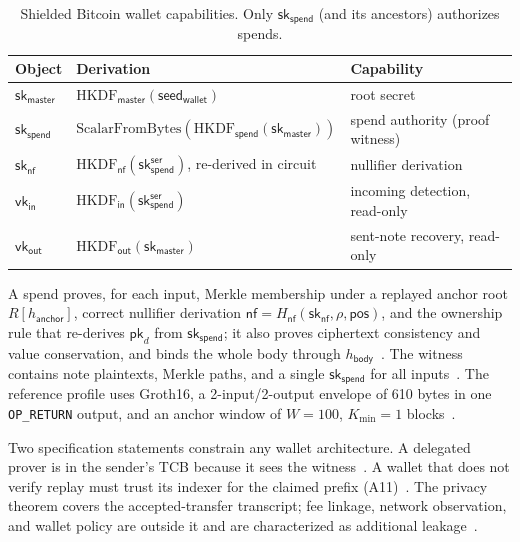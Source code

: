 \documentclass[11pt]{article}
\theoremstyle{remark}
\newcommand{\sk}{\mathsf{sk}}
\newcommand{\vk}{\mathsf{vk}}
\newcommand{\seed}{\mathsf{seed}_{\mathsf{wallet}}}
\newcommand{\SB}{Shielded Bitcoin}
\begin{document}
\begin{table}[t]
\centering\small
\begin{tabularx}{\linewidth}{@{}lXl@{}}
\toprule
Object & Derivation~\cite{sb26} & Capability \\
\midrule
$\sk_{\mathsf{master}}$ & $\mathrm{HKDF}_{\mathsf{master}}(\seed)$ & root secret \\
$\sk_{\mathsf{spend}}$ & $\mathrm{ScalarFromBytes}(\mathrm{HKDF}_{\mathsf{spend}}(\sk_{\mathsf{master}}))$ & spend authority (proof witness) \\
$\sk_{\mathsf{nf}}$ & $\mathrm{HKDF}_{\mathsf{nf}}(\sk^{\mathsf{ser}}_{\mathsf{spend}})$, re-derived in circuit & nullifier derivation \\
$\vk_{\mathsf{in}}$ & $\mathrm{HKDF}_{\mathsf{in}}(\sk^{\mathsf{ser}}_{\mathsf{spend}})$ & incoming detection, read-only \\
$\vk_{\mathsf{out}}$ & $\mathrm{HKDF}_{\mathsf{out}}(\sk_{\mathsf{master}})$ & sent-note recovery, read-only \\
\bottomrule
\end{tabularx}
\caption{\SB{} wallet capabilities. Only $\sk_{\mathsf{spend}}$ (and its ancestors) authorizes spends.}
\label{tab:caps}
\end{table}

A spend proves, for each input, Merkle membership under a replayed anchor root $R[h_{\mathsf{anchor}}]$, correct nullifier derivation $\mathsf{nf} = H_{\mathsf{nf}}(\sk_{\mathsf{nf}}, \rho, \mathsf{pos})$, and the ownership rule that re-derives $\mathsf{pk}_d$ from $\sk_{\mathsf{spend}}$; it also proves ciphertext consistency and value conservation, and binds the whole body through $h_{\mathsf{body}}$~\cite[§13--14]{sb26}. The witness contains note plaintexts, Merkle paths, and a single $\sk_{\mathsf{spend}}$ for all inputs~\cite[§14.3]{sb26}. The reference profile uses Groth16, a 2-input/2-output envelope of 610 bytes in one \texttt{OP\_RETURN} output, and an anchor window of $W{=}100$, $K_{\min}{=}1$ blocks~\cite[App.~A]{sb26}.

Two specification statements constrain any wallet architecture. A delegated prover is in the sender's TCB because it sees the witness~\cite[§10]{sb26}. A wallet that does not verify replay must trust its indexer for the claimed prefix (A11)~\cite[§17]{sb26}. The privacy theorem covers the accepted-transfer transcript; fee linkage, network observation, and wallet policy are outside it and are characterized as additional leakage~\cite[§20]{sb26}.
\end{document}
